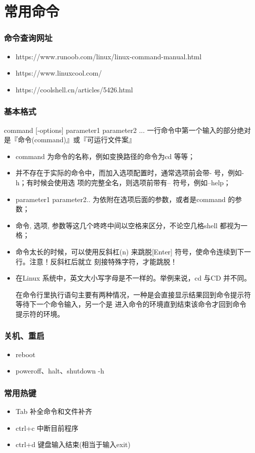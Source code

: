 \documentclass[notheorems,serif]{beamer}
\begin{document}
\section{常用命令}
\begin{frame}
\frametitle{命令查询网址}
\begin{itemize}
\item https://www.runoob.com/linux/linux-command-manual.html
\item https://www.linuxcool.com/
\item https://coolshell.cn/articles/5426.html
\end{itemize}
\end{frame}

\begin{frame}
\frametitle{基本格式}
command [-options] parameter1 parameter2 ...
一行命令中第一个输入的部分绝对是『命令(command)』或『可运行文件案』
\begin{itemize}
\item command 为命令的名称，例如变换路径的命令为cd 等等；
\item [] 并不存在于实际的命令中，而加入选项配置时，通常选项前会带- 号，例如-h；有时候会使用选
项的完整全名，则选项前带有– 符号，例如–help；
\item parameter1 parameter2.. 为依附在选项后面的参数，或者是command 的参数；
\item 命令, 选项, 参数等这几个咚咚中间以空格来区分，不论空几格shell 都视为一格；
\item 命令太长的时候，可以使用反斜杠(n) 来跳脱[Enter] 符号，使命令连续到下一行。注意！反斜杠后就立
刻接特殊字符，才能跳脱！
\item 在Linux 系统中，英文大小写字母是不一样的。举例来说，cd 与CD 并不同。

在命令行里执行语句主要有两种情况，一种是会直接显示结果回到命令提示符等待下一个命令输入，另一个是
进入命令的环境直到结束该命令才回到命令提示符的环境。
\end{itemize}
\end{frame}

\begin{frame}
\frametitle{关机、重启}
\begin{itemize}
\item reboot
\item poweroff、halt、shutdown -h
\end{itemize}
\end{frame}

\begin{frame}
\frametitle{常用热键}
\begin{itemize}
\item Tab 补全命令和文件补齐
\item ctrl+c 中断目前程序
\item ctrl+d 键盘输入结束(相当于输入exit)
\end{itemize}
\end{frame}
\end{document}
